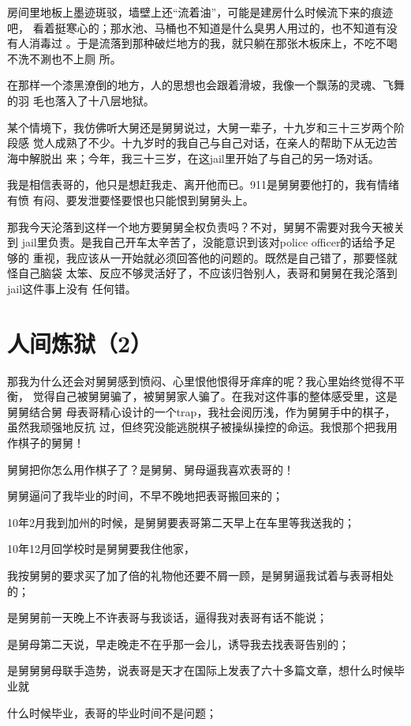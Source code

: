 \documentclass[12pt]{book}
\begin{document}
房间里地板上墨迹斑驳，墙壁上还“流着油”，可能是建房什么时候流下来的痕迹吧，
看着挺寒心的；那水池、马桶也不知道是什么臭男人用过的，也不知道有没有人消毒过
。于是流落到那种破烂地方的我，就只躺在那张木板床上，不吃不喝不洗不涮也不上厕
所。

在那样一个漆黑潦倒的地方，人的思想也会跟着滑坡，我像一个飘荡的灵魂、飞舞的羽
毛也落入了十八层地狱。

某个情境下，我仿佛听大舅还是舅舅说过，大舅一辈子，十九岁和三十三岁两个阶段感
觉人成熟了不少。十九岁时的我自己与自己对话，在亲人的帮助下从无边苦海中解脱出
来；今年，我三十三岁，在这jail里开始了与自己的另一场对话。

我是相信表哥的，他只是想赶我走、离开他而已。911是舅舅要他打的，我有情绪有愤
有闷、要发泄要怪要恨也只能恨到舅舅头上。

那我今天沦落到这样一个地方要舅舅全权负责吗？不对，舅舅不需要对我今天被关到
jail里负责。是我自己开车太辛苦了，没能意识到该对police officer的话给予足够的
重视，我应该从一开始就必须回答他的问题的。既然是自己错了，那要怪就怪自己脑袋
太笨、反应不够灵活好了，不应该归咎别人，表哥和舅舅在我沦落到jail这件事上没有
任何错。
\section{人间炼狱（2）}
\label{sec-10-2}

那我为什么还会对舅舅感到愤闷、心里恨他恨得牙痒痒的呢？我心里始终觉得不平衡，
觉得自己被舅舅骗了，被舅舅家人骗了。在我对这件事的整体感受里，这是舅舅结合舅
母表哥精心设计的一个trap，我社会阅历浅，作为舅舅手中的棋子，虽然我顽强地反抗
过，但终究没能逃脱棋子被操纵操控的命运。我恨那个把我用作棋子的舅舅！

舅舅把你怎么用作棋子了？是舅舅、舅母逼我喜欢表哥的！

舅舅逼问了我毕业的时间，不早不晚地把表哥搬回来的；

10年2月我到加州的时候，是舅舅要表哥第二天早上在车里等我送我的；

10年12月回学校时是舅舅要我住他家，

我按舅舅的要求买了加了倍的礼物他还要不屑一顾，是舅舅逼我试着与表哥相处的；

是舅舅前一天晚上不许表哥与我谈话，逼得我对表哥有话不能说；

是舅母第二天说，早走晚走不在乎那一会儿，诱导我去找表哥告别的；

是舅舅舅母联手造势，说表哥是天才在国际上发表了六十多篇文章，想什么时候毕业就

什么时候毕业，表哥的毕业时间不是问题；
\end{document}
